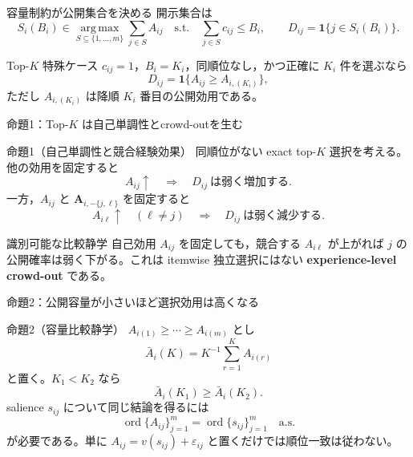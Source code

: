 \documentclass[aspectratio=169,10pt]{beamer}
\newcommand{\1}{\mathbf{1}}
\newcommand{\A}{\bm{A}}
\newcommand{\argmax}{\operatorname*{arg\,max}}
\newcommand{\ord}{\operatorname{ord}}
\begin{document}
\begin{frame}{容量制約が公開集合を決める}
開示集合は
\[
S_i(B_i)\in\argmax_{S\subseteq\{1,\ldots,m\}}
\sum_{j\in S}A_{ij}
\quad\text{s.t.}\quad
\sum_{j\in S}c_{ij}\le B_i,
\qquad D_{ij}=\1\{j\in S_i(B_i)\}.
\tag{SEL}
\]
\begin{block}{Top-$K$ 特殊ケース}
$c_{ij}=1$，$B_i=K_i$，同順位なし，かつ正確に $K_i$ 件を選ぶなら
\[
D_{ij}=\1\{A_{ij}\ge A_{i,(K_i)}\},
\]
ただし $A_{i,(K_i)}$ は降順 $K_i$ 番目の公開効用である。
\end{block}
\end{frame}

\begin{frame}{命題1：Top-$K$ は自己単調性とcrowd-outを生む}
\begin{block}{命題1（自己単調性と競合経験効果）}
同順位がない exact top-$K$ 選択を考える。他の効用を固定すると
\[
A_{ij}\uparrow\quad\Longrightarrow\quad D_{ij}\ \text{は弱く増加する}.
\]
一方，$A_{ij}$ と $\A_{i,-\{j,\ell\}}$ を固定すると
\[
A_{i\ell}\uparrow\quad(\ell\ne j)
\quad\Longrightarrow\quad
D_{ij}\ \text{は弱く減少する}.
\tag{CO}
\]
\end{block}
\begin{alertblock}{識別可能な比較静学}
自己効用 $A_{ij}$ を固定しても，競合する $A_{i\ell}$ が上がれば
$j$ の公開確率は弱く下がる。これは itemwise 独立選択にはない
\textbf{experience-level crowd-out} である。
\end{alertblock}
\end{frame}

\begin{frame}{命題2：公開容量が小さいほど選択効用は高くなる}
\begin{block}{命題2（容量比較静学）}
$A_{i(1)}\ge\cdots\ge A_{i(m)}$ とし
\[
\bar A_i(K)=K^{-1}\sum_{r=1}^{K}A_{i(r)}
\]
と置く。$K_1<K_2$ なら
\[
\bar A_i(K_1)\ge\bar A_i(K_2).
\tag{CAP}
\]
salience $s_{ij}$ について同じ結論を得るには
\[
\ord\{A_{ij}\}_{j=1}^m=\ord\{s_{ij}\}_{j=1}^m\quad\text{a.s.}
\]
が必要である。単に $A_{ij}=v(s_{ij})+\varepsilon_{ij}$ と置くだけでは順位一致は従わない。
\end{block}
\end{frame}
\end{document}
